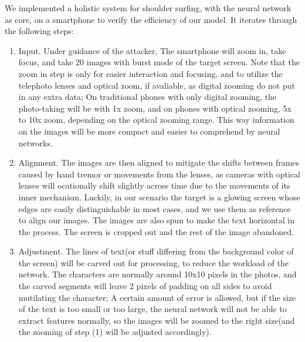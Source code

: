 We implemented a holistic system for shoulder surfing, with the neural network as core, on a smartphone to verify the efficiency of our model. It iterates through the following steps: 
\begin{enumerate}

\item Input. Under guidance of the attacker, The smartphone will zoom in, take focus, and take 20 images with burst mode of the target screen. Note that the zoom in step is only for easier interaction and focusing, and to utilize the telephoto lenses and optical zoom, if avaliable, as digital zooming do not put in any extra data; On traditional phones with only digital zooming, the photo-taking will be with 1x zoom, and on phones with optical zooming, 5x to 10x zoom, depending on the optical zooming range. This way information on the images will be more compact and easier to comprehend by neural networks.

\item Alignment. The images are then aligned to mitigate the shifts between frames caused by hand tremor or movements from the lenses, as cameras with optical lenses will ocationally shift slightly across time due to the movements of its inner mechanism. Luckily, in our scenario the target is a glowing screen whose edges are easily distinguishable in most cases, and we use them as reference to align our images. The images are also spun to make the text horizontal in the process. The screen is cropped out and the rest of the image abandoned.

\item Adjustment. The lines of text(or stuff differing from the background color of the screen) will be carved out for processing, to reduce the workload of the network. The characters are normally around 10x10 pixels in the photos, and the carved segments will leave 2 pixels of padding on all sides to avoid mutilating the character; A certain amount of error is allowed, but if the size of the text is too small or too large, the neural network will not be able to extract features normally, so the images will be zoomed to the right size(and the zooming of step (1) will be adjusted accordingly).


\end{enumerate}
